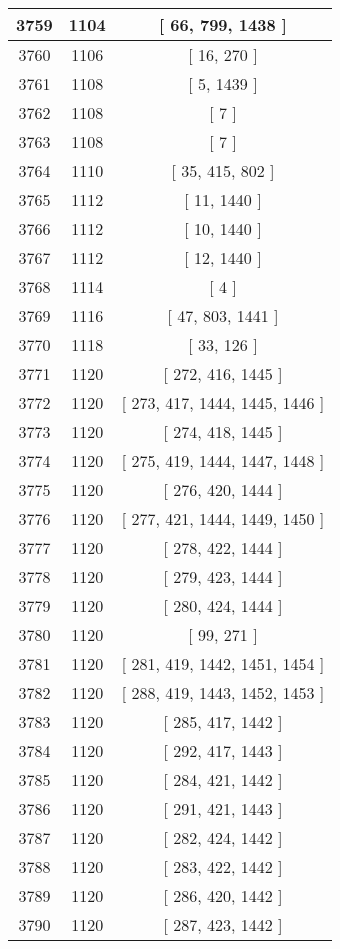 \begin{center}
\begin{longtable}[H]{|| c c c ||}
\hline
3759 & 1104 & [ 66, 799, 1438 ] \\ 
\hline
3760 & 1106 & [ 16, 270 ] \\ 
\hline
3761 & 1108 & [ 5, 1439 ] \\ 
\hline
3762 & 1108 & [ 7 ] \\ 
\hline
3763 & 1108 & [ 7 ] \\ 
\hline
3764 & 1110 & [ 35, 415, 802 ] \\ 
\hline
3765 & 1112 & [ 11, 1440 ] \\ 
\hline
3766 & 1112 & [ 10, 1440 ] \\ 
\hline
3767 & 1112 & [ 12, 1440 ] \\ 
\hline
3768 & 1114 & [ 4 ] \\ 
\hline
3769 & 1116 & [ 47, 803, 1441 ] \\ 
\hline
3770 & 1118 & [ 33, 126 ] \\ 
\hline
3771 & 1120 & [ 272, 416, 1445 ] \\ 
\hline
3772 & 1120 & [ 273, 417, 1444, 1445, 1446 ] \\ 
\hline
3773 & 1120 & [ 274, 418, 1445 ] \\ 
\hline
3774 & 1120 & [ 275, 419, 1444, 1447, 1448 ] \\ 
\hline
3775 & 1120 & [ 276, 420, 1444 ] \\ 
\hline
3776 & 1120 & [ 277, 421, 1444, 1449, 1450 ] \\ 
\hline
3777 & 1120 & [ 278, 422, 1444 ] \\ 
\hline
3778 & 1120 & [ 279, 423, 1444 ] \\ 
\hline
3779 & 1120 & [ 280, 424, 1444 ] \\ 
\hline
3780 & 1120 & [ 99, 271 ] \\ 
\hline
3781 & 1120 & [ 281, 419, 1442, 1451, 1454 ] \\ 
\hline
3782 & 1120 & [ 288, 419, 1443, 1452, 1453 ] \\ 
\hline
3783 & 1120 & [ 285, 417, 1442 ] \\ 
\hline
3784 & 1120 & [ 292, 417, 1443 ] \\ 
\hline
3785 & 1120 & [ 284, 421, 1442 ] \\ 
\hline
3786 & 1120 & [ 291, 421, 1443 ] \\ 
\hline
3787 & 1120 & [ 282, 424, 1442 ] \\ 
\hline
3788 & 1120 & [ 283, 422, 1442 ] \\ 
\hline
3789 & 1120 & [ 286, 420, 1442 ] \\ 
\hline
3790 & 1120 & [ 287, 423, 1442 ] \\ 

\end{longtable}
\end{center}
